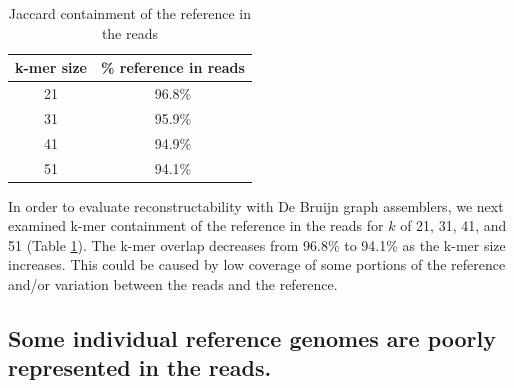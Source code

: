 \documentclass[11pt]{article}
\begin{document}
\begin{table}[t]
\caption{Jaccard containment of the reference in the reads}
\centering
\begin{tabular}{|c|c|}
\hline
\textbf{k-mer size} & {\textbf \% reference in reads } \\ [0.5ex]
\hline
21 & 96.8\% \\
\hline
31 & 95.9\% \\
\hline
41 & 94.9\% \\
\hline
51 & 94.1\% \\
\hline
\end{tabular}
\label{table:ref_in_reads}
\end{table}

In order to evaluate reconstructability with De Bruijn graph
assemblers, we next examined k-mer containment of the reference in the
reads for $k$ of 21, 31, 41, and 51 (Table \ref{table:ref_in_reads}).
The k-mer overlap decreases from 96.8\% to 94.1\% as the k-mer size
increases. This could be caused by low coverage of some portions
of the reference and/or variation between the reads and the reference.



\subsection*{Some individual reference genomes are poorly represented in the reads.}

\end{document}
